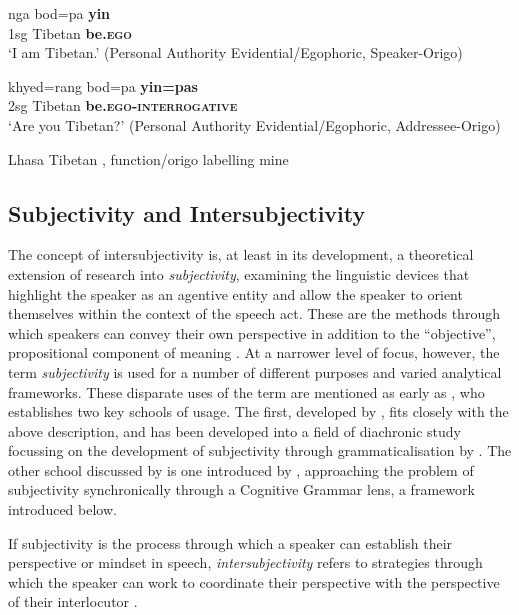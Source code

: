 \begin{exe}
\ex\label{ex:OrigoShift}
\begin{xlist}
\ex \label{ex:OrigoShift:a} \texttibetan{} %
\gll nga bod=pa \textbf{yin} \\ 
1sg Tibetan \textbf{be.\textsc{ego}} \\
\glt `I am Tibetan.' (Personal Authority Evidential/Egophoric, Speaker-Origo)

\ex \label{ex:OrigoShift:b}
\gll khyed=rang bod=pa \textbf{yin=pas} \\
2sg Tibetan \textbf{be.\textsc{ego}-\textsc{interrogative}} \\
\glt `Are you Tibetan?' (Personal Authority Evidential/Egophoric, Addressee-Origo)
\end{xlist}
Lhasa Tibetan \cite[Tibetic: PRC,][394]{DeLancey2017Tibetan}, function/origo labelling mine
\end{exe}

\subsection{Subjectivity and Intersubjectivity}
The concept of intersubjectivity is, at least in its development, a theoretical extension of research into \textit{subjectivity}, examining the linguistic devices that highlight the speaker as an agentive entity and allow the speaker to orient themselves within the context of the speech act. These are the methods through which speakers can convey their own perspective in addition to the ``objective'', propositional component of meaning \cite{Finegan1995}. At a narrower level of focus, however, the term \textit{subjectivity} is used for a number of different purposes and varied analytical frameworks. These disparate uses of the term are mentioned as early as , who establishes two key schools of usage. The first, developed by , fits closely with the above description, and has been developed into a field of diachronic study focussing on the development of subjectivity through grammaticalisation by . The other school discussed by  is one introduced by , approaching the problem of subjectivity synchronically through a Cognitive Grammar lens, a framework introduced below.
    
If subjectivity is the process through which a speaker can establish their perspective or mindset in speech, \textit{intersubjectivity} refers to strategies through which the speaker can work to coordinate their perspective with the perspective of their interlocutor \cite{Brems2014}.

